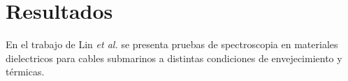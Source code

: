 \chapter{Resultados}

En el trabajo de Lin \textit{et al.} \cite{liu} se presenta pruebas de spectroscopia en materiales dielectricos para cables submarinos a distintas condiciones de envejecimiento y térmicas.
\chapterbibliography
